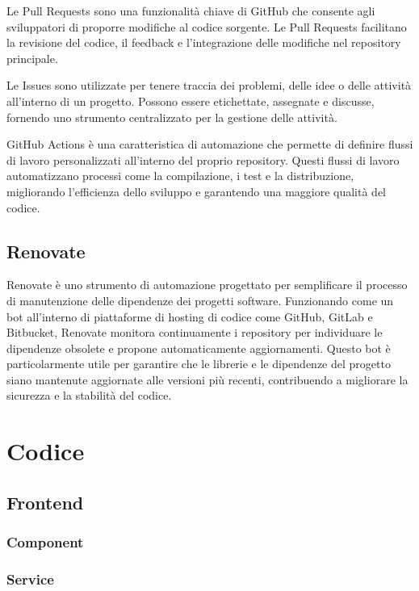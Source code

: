 \documentclass[12pt,a4paper,openright,twoside]{book}
\begin{document}
Le Pull Requests sono una funzionalità chiave di GitHub che consente agli sviluppatori di proporre modifiche al codice sorgente. Le Pull Requests facilitano la revisione del codice, il feedback e l'integrazione delle modifiche nel repository principale.

Le Issues sono utilizzate per tenere traccia dei problemi, delle idee o delle attività all'interno di un progetto. Possono essere etichettate, assegnate e discusse, fornendo uno strumento centralizzato per la gestione delle attività.

GitHub Actions è una caratteristica di automazione che permette di definire flussi di lavoro personalizzati all'interno del proprio repository. Questi flussi di lavoro automatizzano processi come la compilazione, i test e la distribuzione, migliorando l'efficienza dello sviluppo e garantendo una maggiore qualità del codice.

\section{Renovate}

Renovate è uno strumento di automazione progettato per semplificare il processo di manutenzione delle dipendenze dei progetti software. Funzionando come un bot all'interno di piattaforme di hosting di codice come GitHub, GitLab e Bitbucket, Renovate monitora continuamente i repository per individuare le dipendenze obsolete e propone automaticamente aggiornamenti. Questo bot è particolarmente utile per garantire che le librerie e le dipendenze del progetto siano mantenute aggiornate alle versioni più recenti, contribuendo a migliorare la sicurezza e la stabilità del codice.

\chapter{Codice}

\section{Frontend}

\subsection*{Component}

\subsection*{Service}
\end{document}
